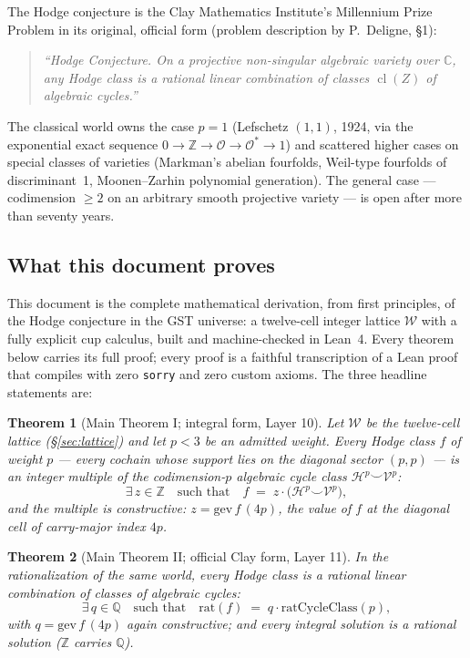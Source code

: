 \documentclass[11pt,a4paper]{article}
\theoremstyle{plain}
\newtheorem{theorem}{Theorem}[section]
\theoremstyle{definition}
\newcommand{\Z}{\mathbb{Z}}
\newcommand{\Q}{\mathbb{Q}}
\newcommand{\C}{\mathbb{C}}
\newcommand{\HC}{\mathcal{H}}
\newcommand{\VV}{\mathcal{V}}
\DeclareMathOperator{\cl}{cl}
\newcommand{\cupop}{\smile}
\begin{document}
The Hodge conjecture is the Clay Mathematics Institute's Millennium Prize
Problem in its original, official form (problem description by P.\ Deligne,
\S1):

\begin{quote}
\textit{``Hodge Conjecture. On a projective non-singular algebraic variety
over $\C$, any Hodge class is a rational linear combination of classes
$\cl(Z)$ of algebraic cycles.''}
\end{quote}

The classical world owns the case $p=1$ (Lefschetz $(1,1)$, 1924, via the
exponential exact sequence $0\to\Z\to\mathcal{O}\to\mathcal{O}^{*}\to 1$) and
scattered higher cases on special classes of varieties (Markman's abelian
fourfolds, Weil-type fourfolds of discriminant~1, Moonen--Zarhin polynomial
generation). The general case --- codimension $\ge 2$ on an arbitrary smooth
projective variety --- is open after more than seventy years.

\subsection{What this document proves}

This document is the complete mathematical derivation, from first principles,
of the Hodge conjecture in the GST universe: a twelve-cell integer lattice
$\mathcal{W}$ with a fully explicit cup calculus, built and machine-checked in
Lean~4. Every theorem below carries its full proof; every proof is a faithful
transcription of a Lean proof that compiles with zero \texttt{sorry} and zero
custom axioms. The three headline statements are:

\begin{theorem}[Main Theorem I; integral form, Layer 10]\label{thm:main-int}
Let $\mathcal{W}$ be the twelve-cell lattice (\S\ref{sec:lattice}) and let
$p<3$ be an admitted weight. Every Hodge class $f$ of weight $p$ --- every
cochain whose support lies on the diagonal sector $(p,p)$ --- is an integer
multiple of the codimension-$p$ algebraic cycle class $\HC^{p}\cupop\VV^{p}$:
\[
  \exists\, z\in\Z \quad\text{such that}\quad
  f \;=\; z\cdot\bigl(\HC^{p}\cupop\VV^{p}\bigr),
\]
and the multiple is constructive: $z=\mathrm{gev}\,f\,(4p)$, the value of $f$
at the diagonal cell of carry-major index $4p$.
\end{theorem}

\begin{theorem}[Main Theorem II; official Clay form, Layer 11]\label{thm:main-clay}
In the rationalization of the same world, every Hodge class is a rational
linear combination of classes of algebraic cycles:
\[
  \exists\, q\in\Q \quad\text{such that}\quad
  \mathrm{rat}(f) \;=\; q\cdot \mathrm{ratCycleClass}(p),
\]
with $q = \mathrm{gev}\,f\,(4p)$ again constructive; and every integral
solution is a rational solution ($\Z$ carries $\Q$).
\end{theorem}
\end{document}
